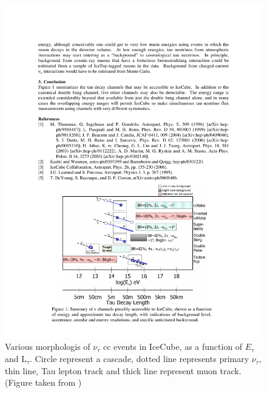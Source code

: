 \begin{figure}
	\centering \includegraphics{./figures/nu_in_icecube/tau_interactions.pdf}
	\caption[$\nu_{\tau}$-CC interactions and their event signatures in IceCube]{Various morphologis of $\nu_{\tau}$ cc events in IceCube, as a function of $E_{\tau}$ and $\mathrm{L}_\tau$. Circle represent a cascade, dotted line represents primary $\nu_{\tau}$, thin line, Tau lepton track and thick line represent muon track.(Figure taken from \cite{Tau_int_inice})}
\end{figure}

